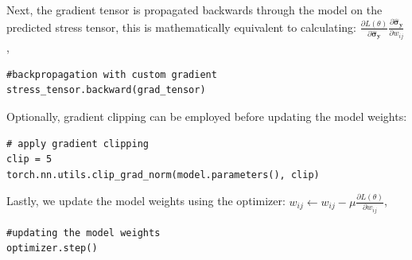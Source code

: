 Next, the gradient tensor is propagated backwards through the model on the predicted stress tensor, this is mathematically equivalent to calculating:
$
\frac{\partial L (\theta)}{\partial \boldsymbol{\hat{\sigma}_y}}
\frac{\partial \boldsymbol{\hat{\sigma}_y}}{\partial w_{ij}}
$,

\begin{lstlisting}
#backpropagation with custom gradient
stress_tensor.backward(grad_tensor)
\end{lstlisting}

Optionally, gradient clipping can be employed before updating the model weights:

\begin{lstlisting}
# apply gradient clipping
clip = 5
torch.nn.utils.clip_grad_norm(model.parameters(), clip)
\end{lstlisting}

Lastly, we update the model weights using the optimizer:
$w_{ij} \leftarrow w_{ij} - \mu \frac{\partial L (\theta)}{\partial w_{ij}}$,
\begin{lstlisting}
#updating the model weights
optimizer.step()
\end{lstlisting}


